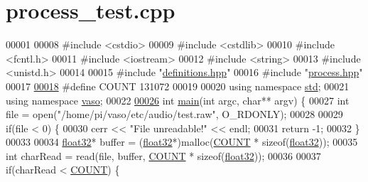 \hypertarget{process__test_8cpp_source}{\section{process\+\_\+test.\+cpp}
\label{process__test_8cpp_source}
}

\begin{DoxyCode}
00001 
00008 \textcolor{preprocessor}{#include <cstdio>}
00009 \textcolor{preprocessor}{#include <cstdlib>}
00010 \textcolor{preprocessor}{#include <fcntl.h>}
00011 \textcolor{preprocessor}{#include <iostream>}
00012 \textcolor{preprocessor}{#include <string>}
00013 \textcolor{preprocessor}{#include <unistd.h>}
00014 
00015 \textcolor{preprocessor}{#include "\hyperlink{definitions_8hpp}{definitions.hpp}"}
00016 \textcolor{preprocessor}{#include "\hyperlink{process_8hpp}{process.hpp}"}
00017 
\hypertarget{process__test_8cpp_source_l00018}{}\hyperlink{process__test_8cpp_a698c124f1c293f98840449d6c5b9d984}{00018} \textcolor{preprocessor}{#define COUNT 131072}
00019 
00020 \textcolor{keyword}{using namespace }\hyperlink{namespacestd}{std};
00021 \textcolor{keyword}{using namespace }\hyperlink{namespacevaso}{vaso};
00022 
\hypertarget{process__test_8cpp_source_l00026}{}\hyperlink{process__test_8cpp_a3c04138a5bfe5d72780bb7e82a18e627}{00026} \textcolor{keywordtype}{int} \hyperlink{process__test_8cpp_a3c04138a5bfe5d72780bb7e82a18e627}{main}(\textcolor{keywordtype}{int} argc, \textcolor{keywordtype}{char}** argv) \{
00027     \textcolor{keywordtype}{int} file = open(\textcolor{stringliteral}{"/home/pi/vaso/etc/audio/test.raw"}, O\_RDONLY);
00028 
00029     \textcolor{keywordflow}{if}(file < 0) \{
00030         cerr << \textcolor{stringliteral}{"File unreadable!"} << endl;
00031         \textcolor{keywordflow}{return} -1;
00032     \}
00033 
00034     \hyperlink{definitions_8hpp_aacdc525d6f7bddb3ae95d5c311bd06a1}{float32}* buffer = (\hyperlink{definitions_8hpp_aacdc525d6f7bddb3ae95d5c311bd06a1}{float32}*)malloc(\hyperlink{process__test_8cpp_a698c124f1c293f98840449d6c5b9d984}{COUNT} * \textcolor{keyword}{sizeof}(\hyperlink{definitions_8hpp_aacdc525d6f7bddb3ae95d5c311bd06a1}{float32}));
00035     \textcolor{keywordtype}{int} charRead = read(file, buffer, \hyperlink{process__test_8cpp_a698c124f1c293f98840449d6c5b9d984}{COUNT} * \textcolor{keyword}{sizeof}(\hyperlink{definitions_8hpp_aacdc525d6f7bddb3ae95d5c311bd06a1}{float32}));
00036 
00037     \textcolor{keywordflow}{if}(charRead < \hyperlink{process__test_8cpp_a698c124f1c293f98840449d6c5b9d984}{COUNT}) \{

\end{DoxyCode}
